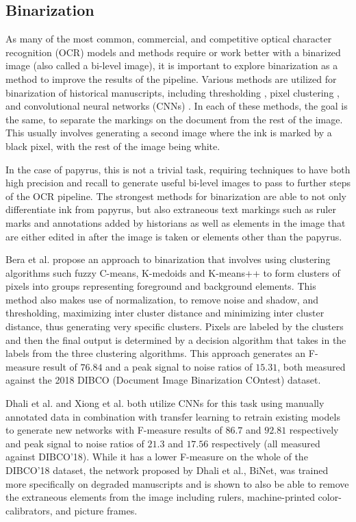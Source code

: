 \documentclass[12pt,a4paper,final]{article}
\begin{document}
\subsection{Binarization}
As many of the most common, commercial, and competitive optical character recognition (OCR) models and methods require or work better with a binarized image \cite{Gupta, Smith, Bar-Yosef2005, Bar-Yosef2007} (also called a bi-level image), it is important to explore binarization as a method to improve the results of the pipeline.
Various methods are utilized for binarization of historical manuscripts, including thresholding \cite{Bar-Yosef2005, Bar-Yosef2007}, pixel clustering \cite{Bera}, and convolutional neural networks (CNNs) \cite{Dhali2019, Dhali2020, Xiong}. In each of these methods, the goal is the same, to separate the markings on the document from the rest of the image. This usually involves generating a second image where the ink is marked by a black pixel, with the rest of the image being white.

In the case of papyrus, this is not a trivial task, requiring techniques to have both high precision and recall to generate useful bi-level images to pass to further steps of the OCR pipeline. The strongest methods for binarization are able to not only differentiate ink from papyrus, but also extraneous text markings such as ruler marks and annotations added by historians as well as elements in the image that are either edited in after the image is taken or elements other than the papyrus.

Bera et al.\cite{Bera} propose an approach to binarization that involves using clustering algorithms such fuzzy C-means, K-medoids and K-means++ to form clusters of pixels into groups representing foreground and background elements. This method also makes use of normalization, to remove noise and shadow, and thresholding, maximizing inter cluster distance and minimizing inter cluster distance, thus generating very specific clusters. Pixels are labeled by the clusters and then the final output is determined by a decision algorithm that takes in the labels from the three clustering algorithms. This approach generates an F-measure result of $76.84$ and a peak signal to noise ratios of $15.31$, both measured against the 2018 DIBCO (Document Image Binarization COntest) dataset\cite{DIBCO2018}.

Dhali et al.\cite{Dhali2019} and Xiong et al.\cite{Xiong} both utilize CNNs for this task using manually annotated data in combination with transfer learning to retrain existing models to generate new networks with F-measure results of $86.7$ and $92.81$ respectively and peak signal to noise ratios of $21.3$ and $17.56$ respectively (all measured against DIBCO'18). While it has a lower F-measure on the whole of the DIBCO'18 dataset, the network proposed by Dhali et al., BiNet, was trained more specifically on degraded manuscripts and is shown to also be able to remove the extraneous elements from the image including rulers, machine-printed color-calibrators, and picture frames.
\end{document}
